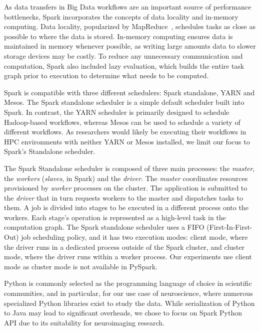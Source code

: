 \documentclass[conference]{IEEEtran}
\begin{document}
As data transfers in Big Data workflows are an important source of performance
bottlenecks, Spark incorporates the concepts of data locality and in-memory 
computing. Data locality, popularized by MapReduce~\cite{dean2008mapreduce},
schedules
tasks as close as possible to where the data is stored. In-memory computing
ensures data is maintained in memory whenever possible, as writing large 
amounts data to slower storage devices may be costly. To reduce any unnecessary
communication and computation, Spark also included lazy evaluation, which
builds the entire task graph prior to execution to determine what needs to be
computed.

Spark is compatible with three different schedulers: Spark
standalone, YARN and Mesos.
The Spark standalone scheduler is a simple default scheduler built into Spark.
In contrast, the YARN scheduler is primarily designed to schedule Hadoop-based 
workflows, whereas Mesos can be used to schedule
a variety of different workflows. As researchers would likely be
executing their workflows in HPC environments with neither YARN or Mesos
installed, we limit our focus to Spark's Standalone scheduler.


The Spark Standalone scheduler is composed of three main processes: the
\emph{master}, the \emph{workers} (\emph{slaves}, in Spark) and the
\emph{driver}. The \emph{master} coordinates resources provisioned by
\emph{worker} processes on the cluster. The application is submitted to the
\emph{driver} that in turn requests workers to the master and dispatches tasks
to them. A job is divided into stages to be executed in a different process onto
the workers. Each stage's operation is represented as a high-level task in the
computation graph. The Spark standalone scheduler uses a FIFO 
(First-In-First-Out) job scheduling policy, and it has
two execution modes: client mode, where the driver runs in a dedicated process
outside of the Spark cluster, and cluster mode, where the driver runs within
a worker process. Our experiments use client mode as cluster mode is not
available in PySpark. 


Python is commonly selected as the programming language of choice in scientific
communities, and in particular, for our use case of neuroscience, where
numerous specialized Python libraries exist to study the data.
While serialization of Python to Java may lead to significant overheads, we
chose to focus on Spark Python API due to its suitability for neuroimaging
research. 
\end{document}
